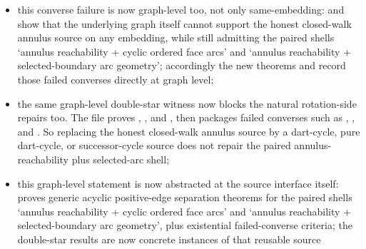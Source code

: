 \documentclass[11pt]{article}
\begin{document}
\begin{itemize}
show that the honest closed-walk annulus source really does imply those weaker
annulus-rooted source shells on the same embedding, so the double-star
counterexamples are precise failed converses rather than shell mismatches;
\item this converse failure is now graph-level too, not only same-embedding:
 and
show that the underlying graph itself cannot support the honest closed-walk
annulus source on any embedding, while still admitting the paired shells
`annulus reachability + cyclic ordered face arcs' and `annulus reachability +
selected-boundary arc geometry'; accordingly the new theorems
and
record those failed converses directly at graph level;
\item the same graph-level double-star witness now blocks the natural
rotation-side repairs too.  The file proves
,
, and
,
then packages failed converses such as
,
,
and
.
So replacing the honest closed-walk annulus source by a dart-cycle, pure
dart-cycle, or successor-cycle source does not repair the paired
annulus-reachability plus selected-arc shell;
\item this graph-level statement is now abstracted at the source interface
itself:  proves generic acyclic
positive-edge separation theorems for the paired shells
`annulus reachability + cyclic ordered face arcs' and `annulus reachability +
selected-boundary arc geometry', plus existential failed-converse criteria;
the double-star results are now concrete instances of that reusable source

\end{itemize}
\end{document}
